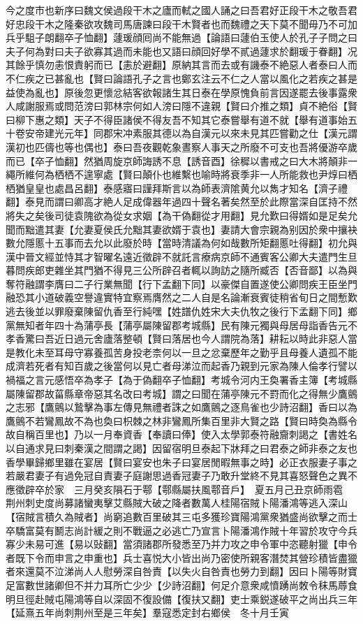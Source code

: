 今之度市也新序曰魏文侯過段干木之廬而軾之國人誦之曰吾君好正段干木之敬吾君好忠段干木之隆秦欲攻魏司馬唐諫曰段干木賢者也而魏禮之天下莫不聞毋乃不可加兵乎駔子朗翻卒子恤翻】蘧瑗顔囘尚不能無過【論語曰蘧伯玉使人於孔子子問之曰夫子何為對曰夫子欲寡其過而未能也又語曰顔回好學不貳過蘧求於翻瑗于眷翻】况其餘乎慎勿恚恨責躬而已【恚於避翻】原納其言而去或有譏泰不絶惡人者泰曰人而不仁疾之已甚亂也【賢曰論語孔子之言也鄭玄注云不仁之人當以風化之若疾之甚是益使為亂也】原後忽更懷忿結客欲報諸生其日泰在學原愧負前言因遂罷去後事露衆人咸謝服焉或問范滂曰郭林宗何如人滂曰隱不違親【賢曰介推之類】貞不絶俗【賢曰柳下惠之類】天子不得臣諸侯不得友吾不知其它泰嘗舉有道不就【舉有道事始五十卷安帝建光元年】同郡宋冲素服其德以為自漢元以來未見其匹嘗勸之仕【漢元謂漢初也匹儔也等也偶也】泰曰吾夜觀乾象晝察人事天之所廢不可支也吾將優游卒歲而已【卒子恤翻】然猶周旋京師誨誘不息【誘音酉】徐穉以書戒之曰大木將顛非一繩所維何為栖栖不遑寧處【賢曰顛仆也維繫也喻時將衰季非一人所能救也尹焞曰栖栖猶皇皇也處昌呂翻】泰感寤曰謹拜斯言以為師表濟隂黄允以雋才知名【濟子禮翻】泰見而謂曰卿高才絶人足成偉器年過四十聲名著矣然至於此際當深自匡持不然將失之矣後司徒袁隗欲為從女求姻【為干偽翻從才用翻】見允歎曰得婿如是足矣允聞而黜遣其妻【允妻夏侯氏允黜其妻欲婿于袁也】妻請大會宗親為别因於衆中攘袂數允隱慝十五事而去允以此廢於時【當時清議為何如哉數所矩翻慝吐得翻】初允與漢中晉文經並恃其才智曜名遠近徵辟不就託言療病京師不通賓客公卿大夫遣門生旦暮問疾郎吏雜坐其門猶不得見三公所辟召者輒以詢訪之隨所臧否【否音鄙】以為與奪符融謂李膺曰二子行業無聞【行下孟翻下同】以豪傑自置遂使公卿問疾王臣坐門融恐其小道破義空譽違實特宜察焉膺然之二人自是名論漸衰賓徒稍省旬日之間慙歎逃去後並以罪廢棄陳留仇香至行純嘿【姓譜仇姓宋大夫仇牧之後行下孟翻下同】鄉黨無知者年四十為蒲亭長【蒲亭屬陳留郡考城縣】民有陳元獨與母居母詣香告元不孝香驚曰吾近日過元舍廬落整頓【賢曰落居也今人謂院為落】耕耘以時此非惡人當是教化未至耳母守寡養孤苦身投老柰何以一旦之忿棄歷年之勤乎且母養人遺孤不能成濟若死者有知百歲之後當何以見亡者母涕泣而起香乃親到元家為陳人倫孝行譬以禍福之言元感悟卒為孝子【為于偽翻卒子恤翻】考城令河内王奐署香主簿【考城縣屬陳留郡故菑縣章帝惡其名改曰考城】謂之曰聞在蒲亭陳元不罸而化之得無少鷹鸇之志邪【鷹鸇以鷙擊為事左傳見無禮者誅之如鷹鸇之逐鳥雀也少詩沼翻】香曰以為鷹鸇不若鸞鳳故不為也奐曰枳棘之林非鸞鳳所集百里非大賢之路【賢曰時奐為縣令故自稱百里也】乃以一月奉資香【奉讀曰俸】使入太學郭泰符融齎刺謁之【書姓名以自通求見曰刺秦漢之間謂之謁】因留宿明旦泰起下牀拜之曰君泰之師非泰之友也香學畢歸鄉里雖在宴居【賢曰宴安也朱子曰宴居閒暇無事之時】必正衣服妻子事之若嚴君妻子有過免冠自責妻子庭謝思過香冠妻子乃敢升堂終不見其喜怒聲色之異不應徵辟卒於家　三月癸亥隕石于鄠【鄠縣屬扶風鄠音戶】　夏五月己丑京師雨雹　荆州刺史度尚募諸蠻夷擊艾縣賊大破之降者數萬人桂陽宿賊卜陽潘鴻等逃入深山【宿賊言積久為賊者】尚窮追數百里破其三屯多獲珍寶陽鴻黨衆猶盛尚欲擊之而士卒驕富莫有鬭志尚計緩之則不戰逼之必逃亡乃宣言卜陽潘鴻作賊十年習於攻守今兵寡少未易可進【易以䜴翻】當須諸郡所發悉至乃并力攻之申令軍中恣聽射獵【申令者既下令而申言之申重也】兵士喜悦大小皆出尚乃密使所親客潛焚其營珍積皆盡獵者來還莫不泣涕尚人人慰勞深自咎責【以失火自咎責也勞力到翻】因曰卜陽等財寶足富數世諸卿但不并力耳所亡少少【少詩沼翻】何足介意衆咸憤踴尚敇令秣馬蓐食明旦徑赴賊屯陽鴻等自以深固不復設備【復扶又翻】吏士乘鋭遂破平之尚出兵三年【延熹五年尚刺荆州至是三年矣】羣寇悉定封右鄉侯　冬十月壬寅